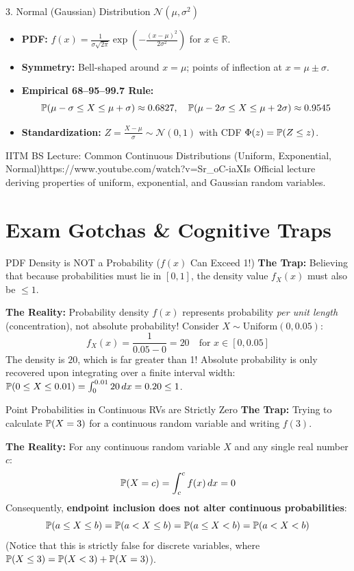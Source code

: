 \begin{formulabox}{3. Normal (Gaussian) Distribution $\mathcal{N}(\mu, \sigma^2)$}
\begin{itemize}
    \item \textbf{PDF:} $f(x) = \frac{1}{\sigma \sqrt{2\pi}} \exp\left( -\frac{(x - \mu)^2}{2\sigma^2} \right)$ for $x \in \mathbb{R}$.
    \item \textbf{Symmetry:} Bell-shaped around $x = \mu$; points of inflection at $x = \mu \pm \sigma$.
    \item \textbf{Empirical 68--95--99.7 Rule:}
    $$\P(\mu - \sigma \le X \le \mu + \sigma) \approx 0.6827, \quad \P(\mu - 2\sigma \le X \le \mu + 2\sigma) \approx 0.9545$$
    \item \textbf{Standardization:} $Z = \frac{X - \mu}{\sigma} \sim \mathcal{N}(0, 1)$ with CDF $\Phi(z) = \P(Z \le z)$.
\end{itemize}
\end{formulabox}

\begin{videocard}{IITM BS Lecture: Common Continuous Distributions (Uniform, Exponential, Normal)}{https://www.youtube.com/watch?v=Sr_oC-iaXIs}
Official lecture deriving properties of uniform, exponential, and Gaussian random variables.
\end{videocard}

\section{Exam Gotchas \& Cognitive Traps}

\begin{trapbox}{PDF Density is NOT a Probability ($f(x)$ Can Exceed 1!)}
\textbf{The Trap:} Believing that because probabilities must lie in $[0, 1]$, the density value $f_X(x)$ must also be $\le 1$.

\textbf{The Reality:} Probability density $f(x)$ represents probability \emph{per unit length} (concentration), not absolute probability!
Consider $X \sim \text{Uniform}(0, 0.05)$:
$$f_X(x) = \frac{1}{0.05 - 0} = 20 \quad \text{for } x \in [0, 0.05]$$
The density is $20$, which is far greater than 1! Absolute probability is only recovered upon integrating over a finite interval width: $\P(0 \le X \le 0.01) = \int_0^{0.01} 20 \, dx = 0.20 \le 1$.
\end{trapbox}

\begin{trapbox}{Point Probabilities in Continuous RVs are Strictly Zero}
\textbf{The Trap:} Trying to calculate $\P(X = 3)$ for a continuous random variable and writing $f(3)$.

\textbf{The Reality:} For any continuous random variable $X$ and any single real number $c$:
$$\P(X = c) = \int_c^c f(x) \, dx = 0$$
Consequently, \textbf{endpoint inclusion does not alter continuous probabilities}:
$$\P(a \le X \le b) = \P(a < X \le b) = \P(a \le X < b) = \P(a < X < b)$$
(Notice that this is strictly false for discrete variables, where $\P(X \le 3) = \P(X < 3) + \P(X = 3)$).
\end{trapbox}

